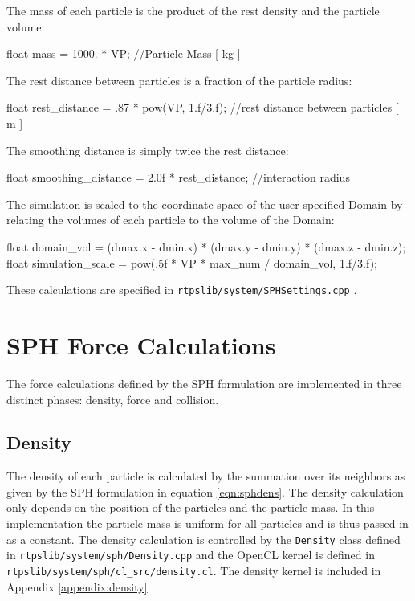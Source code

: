 The mass of each particle is the product of the rest density and the particle volume:
\begin{cppcode}{0}
float mass = 1000. * VP;                         //Particle Mass [ kg ]
\end{cppcode}

The rest distance between particles is a fraction of the particle radius:
\begin{cppcode}{0}
float rest_distance = .87 * pow(VP, 1.f/3.f);   //rest distance between particles [ m ]
\end{cppcode}

The smoothing distance is simply twice the rest distance:
\begin{cppcode}{0}
float smoothing_distance = 2.0f * rest_distance; //interaction radius
\end{cppcode}

The simulation is scaled to the coordinate space of the user-specified Domain
by relating the volumes of each particle to the volume of the Domain:
\begin{cppcode}{0}
float domain_vol = (dmax.x - dmin.x) * (dmax.y - dmin.y) * (dmax.z - dmin.z);
float simulation_scale = pow(.5f * VP * max_num / domain_vol, 1.f/3.f);
\end{cppcode}

These calculations are specified in \verb|rtpslib/system/SPHSettings.cpp| \cite{Krog2010}.


\section{SPH Force Calculations}
The force calculations defined by the SPH formulation are implemented in three
distinct phases: density, force and collision.

\subsection{Density}
The density of each particle is calculated by the summation over its neighbors
as given by the SPH formulation in equation \ref{eqn:sphdens}. The density
calculation only depends on the position of the particles and the particle
mass. In this implementation the particle mass is uniform for all particles and
is thus passed in as a constant.  The density calculation is controlled by the
\verb|Density| class defined in \verb|rtpslib/system/sph/Density.cpp| and the
OpenCL kernel is defined in \verb|rtpslib/system/sph/cl_src/density.cl|. The
density kernel is included in Appendix \ref{appendix:density}.

